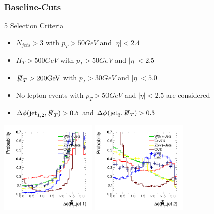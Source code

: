  
\begin{frame}
	\frametitle{Baseline-Cuts}
	\begin{block}{5 Selection Criteria}
		\begin{itemize}
			\item $N_{\si{jets}} > 3$ with $p_T > 50 \si{ GeV}$ and $\lvert\eta\rvert < 2.4$
			\item $H_T > 500\si{GeV}$ with $p_T > 50 \si{ GeV}$ and $\lvert\eta\rvert < 2.5$
			\item $\slashed{H}_T > 200\si{GeV}$ with $p_T > 30 \si{GeV}$ and $\lvert\eta\rvert < 5.0$	
			\item No lepton events with  $p_T > 50 \si{ GeV}$ and $\lvert\eta\rvert < 2.5$ are considered
			\item $\Delta\phi(\si{jet}_{1,2},\slashed{H}_T) > 0.5$ and  $\Delta\phi(\si{jet}_3,\slashed{H}_T) > 0.3$
		\end{itemize}
	\end{block}
	
	\begin{center}
		\includegraphics[width = 0.35\textwidth]{plots10/hDeltaPhi1.png}
		\includegraphics[width = 0.35\textwidth]{plots10/hDeltaPhi2.png}
	\end{center}
	
\end{frame}


